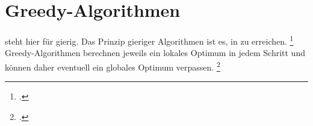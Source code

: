 \documentclass{lehramt-informatik-haupt}
\begin{document}

\chapter{Greedy-Algorithmen}

\begin{liQuellen}
\item \cite[Seite 207-235 (PDF 225-253)]{saake}
\item \cite[Seite 5-6]{aud:fs:3}
\item \cite{wiki:greedy-algorithmus}
\end{liQuellen}

 steht hier für gierig. Das Prinzip gieriger Algorithmen
ist es, in  zu erreichen.
\footcite[Seite 213 (PDF 231)]{saake}
Greedy-Algorithmen berechnen jeweils ein lokales Optimum in jedem Schritt
und können daher eventuell ein globales Optimum verpassen.
\footcite[Seite 214 (PDF 232)]{saake}

\literatur
\end{document}
